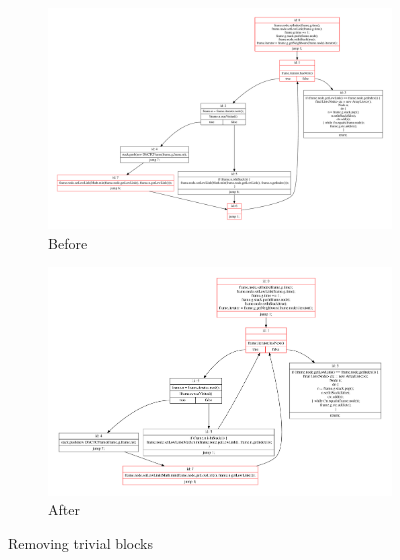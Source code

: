 \begin{figure}[htb]
    \centering
    \begin{subfigure}[b]{\textwidth}
        \centering
        \includegraphics[width=\linewidth]{src/graph/trivial-before.pdf}
        \caption{Before}
    \end{subfigure}
    \begin{subfigure}[b]{\textwidth}
        \centering
        \includegraphics[width=\linewidth]{src/graph/trivial-after.pdf}
        \caption{After}
    \end{subfigure}
    \caption{Removing trivial blocks\label{img:remove}}
\end{figure}